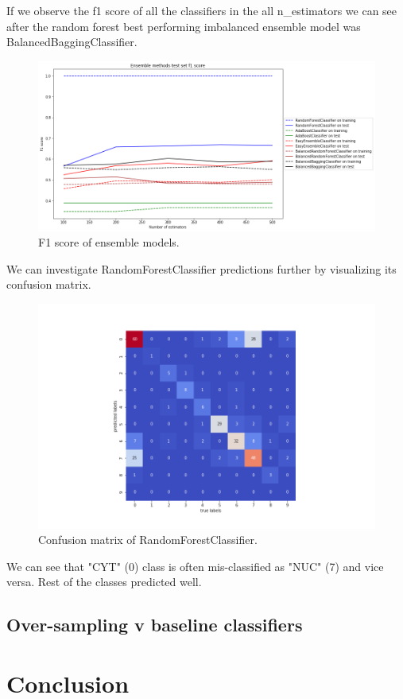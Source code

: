 \documentclass[12pt]{article}
\begin{document}
If we observe the f1 score of all the classifiers in the all n\_estimators we can see after the random forest best performing imbalanced ensemble model was BalancedBaggingClassifier.

\begin{figure}[H] \label{fig:ensemblepf}
    \centering
    \includegraphics[width=\textwidth]{img/ensembletestf1.png}
    \caption{F1 score of ensemble models.}
\end{figure}

We can investigate RandomForestClassifier predictions further by visualizing its confusion matrix.

\begin{figure}[H] \label{fig:rfconfusion}
    \centering
    \includegraphics[width=\textwidth]{img/rfheatmap.png}
    \caption{Confusion matrix of RandomForestClassifier.}
\end{figure}

We can see that "CYT" (0) class is often mis-classified as "NUC" (7) and vice versa. Rest of the classes predicted well.

\subsection{Over-sampling v baseline classifiers}



\section{Conclusion} \label{sec:conclution}

\printbibliography
\end{document}
